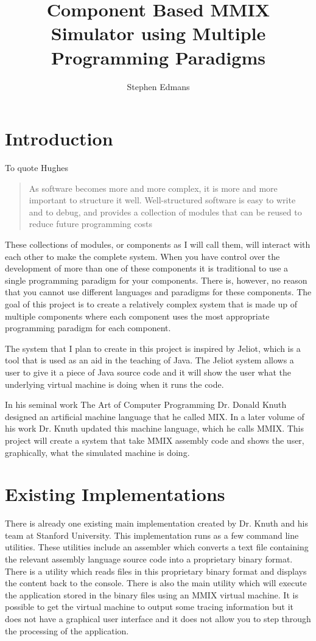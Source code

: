 \documentclass[11pt]{article} %
\title{Component Based MMIX Simulator using Multiple Programming Paradigms}
\author{Stephen Edmans}
\date{} %
\begin{document}
\maketitle
\newpage
\tableofcontents
\newpage
\listoffigures
\newpage
\section{Introduction}
To quote Hughes~\cite{hughes:why}
\begin{quote}
	As software becomes more and more complex, it is more and more important to structure it well. Well-structured software is easy to write and to debug, and provides a collection of modules that can be reused to reduce future programming costs
\end{quote}
These collections of modules, or components as I will call them, will interact with each other to make the complete system. When you have control over the development of more than one of these components it is traditional to use a single programming paradigm for your components. There is, however, no reason that you cannot use different languages and paradigms for these components. The goal of this project is to create a relatively complex system that is made up of multiple components where each component uses the most appropriate programming paradigm for each component.

The system that I plan to create in this project is inspired by Jeliot, which is a tool that is used as an aid in the teaching of Java. %
The Jeliot system allows a user to give it a piece of Java source code and it will show the user what the underlying virtual machine is doing when it runs the code.

In his seminal work The Art of Computer Programming Dr. Donald Knuth designed an artificial machine language that he called MIX. In a later volume of his work Dr. Knuth updated this machine language, which he calls MMIX. This project will create a system that take MMIX assembly code and shows the user, graphically, what the simulated machine is doing.


\section{Existing Implementations}

There is already one existing main implementation created by Dr. Knuth and his team at Stanford University. This implementation runs as a few command line utilities.  These utilities include an assembler which converts a text file containing the relevant assembly language source code into a proprietary binary format.  There is a utility which reads files in this proprietary binary format and displays the content back to the console.  There is also the main utility which will execute the application stored in the binary files using an MMIX virtual machine.  It is possible to get the virtual machine to output some tracing information but it does not have a graphical user interface and it does not allow you to step through the processing of the application.  
\end{document}
